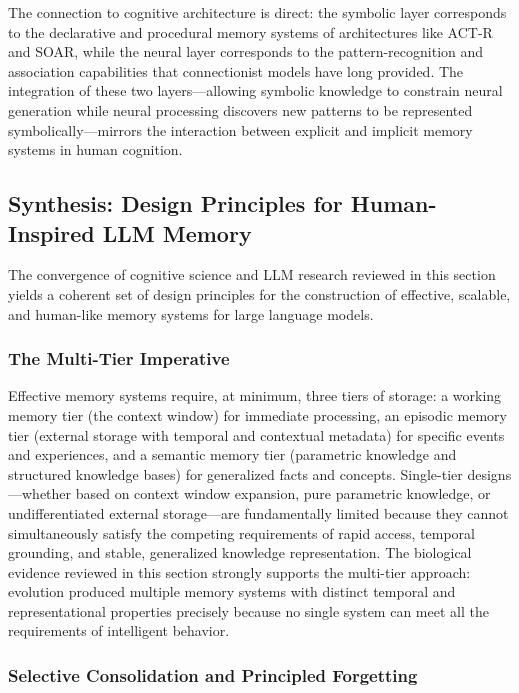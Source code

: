The connection to cognitive architecture is direct: the symbolic layer corresponds to the declarative and procedural memory systems of architectures like ACT-R and SOAR, while the neural layer corresponds to the pattern-recognition and association capabilities that connectionist models have long provided. The integration of these two layers---allowing symbolic knowledge to constrain neural generation while neural processing discovers new patterns to be represented symbolically---mirrors the interaction between explicit and implicit memory systems in human cognition.

\subsection{Synthesis: Design Principles for Human-Inspired LLM Memory}

The convergence of cognitive science and LLM research reviewed in this section yields a coherent set of design principles for the construction of effective, scalable, and human-like memory systems for large language models.

\subsubsection{The Multi-Tier Imperative}

Effective memory systems require, at minimum, three tiers of storage: a working memory tier (the context window) for immediate processing, an episodic memory tier (external storage with temporal and contextual metadata) for specific events and experiences, and a semantic memory tier (parametric knowledge and structured knowledge bases) for generalized facts and concepts. Single-tier designs---whether based on context window expansion, pure parametric knowledge, or undifferentiated external storage---are fundamentally limited because they cannot simultaneously satisfy the competing requirements of rapid access, temporal grounding, and stable, generalized knowledge representation. The biological evidence reviewed in this section strongly supports the multi-tier approach: evolution produced multiple memory systems with distinct temporal and representational properties precisely because no single system can meet all the requirements of intelligent behavior.

\subsubsection{Selective Consolidation and Principled Forgetting}

